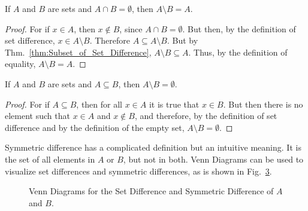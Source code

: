             \begin{theorem}
                If $A$ and $B$ are sets and $A\cap{B}=\emptyset$,
                then $A\setminus{B}=A$.
            \end{theorem}
            \begin{proof}
                For if $x\in{A}$, then $x\notin{B}$, since
                $A\cap{B}=\emptyset$. But then, by the definition of set
                difference, $x\in{A}\setminus{B}$. Therefore
                $A\subseteq{A}\setminus{B}$. But by
                Thm.~\ref{thm:Subset_of_Set_Difference},
                $A\setminus{B}\subseteq{A}$. Thus, by the definition of
                equality, $A\setminus{B}=A$.
            \end{proof}
            \begin{theorem}
                If $A$ and $B$ are sets and $A\subseteq{B}$,
                then $A\setminus{B}=\emptyset$.
            \end{theorem}
            \begin{proof}
                For if $A\subseteq{B}$, then for all
                $x\in{A}$ it is true that $x\in{B}$. But then
                there is no element such that
                $x\in{A}$ and $x\notin{B}$, and therefore, by
                the definition of set difference and by the
                definition of the empty set,
                $A\setminus{B}=\emptyset$.
            \end{proof}
            Symmetric difference has a complicated definition
            but an intuitive meaning. It is the set of all
            elements in $A$ or $B$, but not in both.
            Venn Diagrams can be used to visualize set
            differences and symmetric differences, as is shown in
            Fig.~\ref{fig:Elem_Alg_Venn_Diagram_Differences}.
            \begin{figure}[H]
                \captionsetup{type=figure}
                \centering
                \begin{subfigure}[b]{0.49\textwidth}
                    \captionsetup{type=figure}
                    \centering
                    
                    \label{fig:Elem_Alg_Set_Difference}
                \end{subfigure}
                \begin{subfigure}[b]{0.49\textwidth}
                    \captionsetup{type=figure}
                    \centering
                    
                    \label{fig:Elem_Alg_Symmetric_Difference}
                \end{subfigure}
                \caption[Venn Diagrams for Various Set Operations]
                        {Venn Diagrams for the Set Difference
                         and Symmetric Difference of $A$ and $B$.}
                \label{fig:Elem_Alg_Venn_Diagram_Differences}
            \end{figure}
